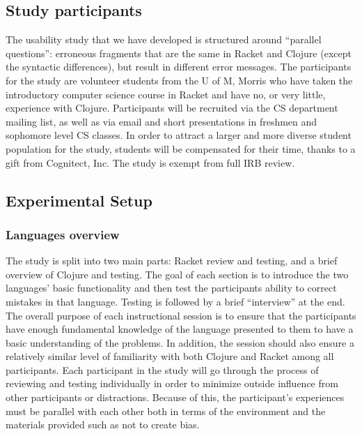 \documentclass[submission,copyright,creativecommons]{eptcs}
\newcommand{\allcomments}[1]{{#1}}
\newcommand{\thcomment}[1]{{\bf \textcolor{blue}{\allcomments{{#1}}}}}
\begin{document}
	\subsection{Study participants}\label{sec:obj}
The usability study that we have developed is structured around ``parallel questions'': erroneous fragments that are the same in 
Racket and Clojure (except the syntactic differences), but result in different error messages.  
The participants for the study are volunteer students from the U of M, Morris who have taken the introductory computer science course in Racket and have no, or very little, experience with Clojure.
Participants will be recruited via the CS department mailing list, as well as via email and short presentations in freshmen and sophomore level CS classes. 
In order to attract a larger and more diverse student population for the study, students will be compensated for their time, thanks to a gift from Cognitect, Inc. 
The study is exempt from full IRB review. 

	\subsection{Experimental Setup}\label{sec:setup}
	
	   


\subsubsection{Languages overview}\label{subsec:overview}

The study is split into two main parts: Racket review and testing, and a brief overview of Clojure and testing.
The goal of each section is to introduce the two languages' basic functionality and then test the participants ability to correct mistakes in that language.
Testing is followed by a brief ``interview'' at the end. 
The overall purpose of each instructional session is to ensure that the participants have enough fundamental knowledge of the language presented to them to have a basic understanding of the problems. 
In addition, the session should also ensure a relatively similar level of familiarity with both Clojure and Racket among all participants. 
Each participant in the study will go through the process of reviewing and testing individually in order to minimize outside influence from other participants or distractions. 
Because of this, the participant's experiences must be parallel with each other both in terms of the environment and the materials provided such as not to create bias.
\end{document}
